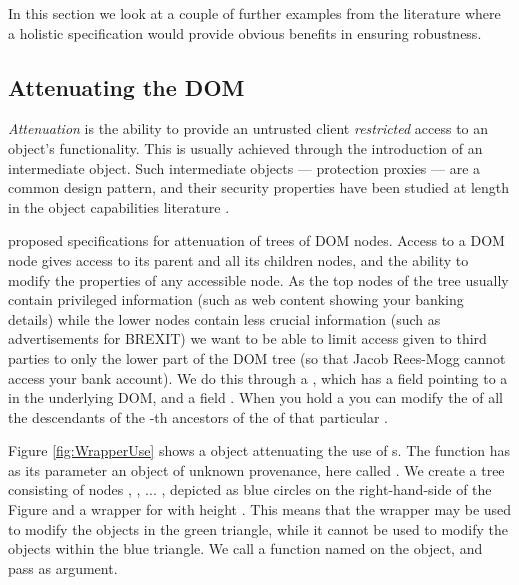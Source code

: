 In this section we look at a couple of further examples from the literature where a holistic specification would provide obvious benefits in ensuring robustness.

\subsection{Attenuating the DOM}
\label{sect:example:DOM}

\emph{Attenuation} is the ability to provide an untrusted client \emph{restricted}  access to an object's functionality. This is usually achieved through the introduction of an intermediate object. Such intermediate objects --- protection proxies \cite{gof} --- are a common design pattern, and their security properties have been studied at length in the object capabilities literature \cite{MillerPhD,murray10-infoflow}.

\citet{dd} proposed specifications for attenuation of trees of DOM  nodes.
Access to a DOM node
gives access to its parent and all its children nodes, and the ability to
modify the properties of any accessible node. As the top nodes of the
tree usually contain privileged information (such as web content
showing your banking details) while the lower nodes contain less
crucial information (such as advertisements for BREXIT) we want to be
able to limit access given to third parties to only the lower part of
the DOM tree (so that Jacob Rees-Mogg cannot access your bank
account). We do this through a , which has
a field  pointing to a  in the underlying DOM, and a field .
When you hold
a  you can modify the  of all the
descendants of the -th ancestors of the  of that
particular . 


Figure \ref{fig:WrapperUse} shows a
 object attenuating the use of 
s.
The
function  has as its parameter an object of unknown
provenance, here called . We create a tree
consisting of nodes , , ... , depicted as blue
circles on the right-hand-side of the Figure and a
wrapper for  with height . This means that the
wrapper  may be used to modify
 the objects in the green triangle, while it cannot be used to
modify the objects within the
blue triangle.  We call a function named  on
the  object, and pass  as argument.

